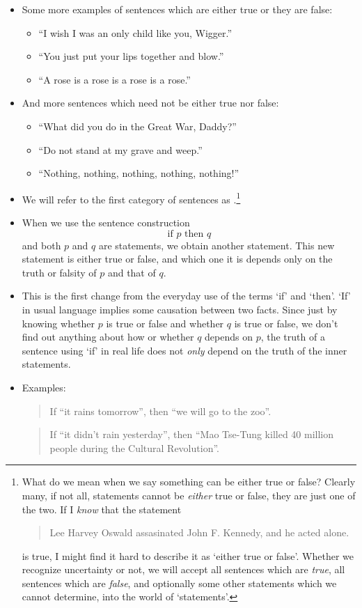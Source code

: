 \begin{itemize}
\item
Some more examples of sentences which are either true or they are false:
\begin{itemize}
 \item
``I wish I was an only child like you, Wigger.''
\item
``You just put your lips together and blow.''
\item
``A rose is a rose is a rose is a rose.''
\end{itemize}
\item
And more sentences which need not be either true nor false:
\begin{itemize}
\item
``What did you do in the Great War, Daddy?''
\item
 ``Do not stand at my grave and weep.''
\item
``Nothing, nothing, nothing, nothing, nothing!''
\end{itemize}
\item
We will refer to the first category of sentences as .\footnote{What do we mean when we say something can be either true or false? Clearly many, if not all, statements cannot be \emph{either} true or false, they are just one of the two. If I \emph{know} that the statement
\begin{quote}
Lee Harvey Oswald assasinated John F. Kennedy, and he acted alone.
\end{quote}
is true, I might find it hard to describe it as `either true or false'. Whether we recognize uncertainty or not, we will accept all sentences which are \emph{true}, all sentences which are \emph{false}, and optionally some other statements which we cannot determine, into the world of `statements'.}
\item
When we use the sentence construction 
\[ \text{if } p \text{ then } q \]
and both $p$ and $q$ are statements, we obtain another statement. This new statement is either true or false, and which one it is depends only on the truth or falsity of $p$ and that of $q$.
\item
This is the first change from the everyday use of the terms `if' and `then'. `If' in usual language implies some causation between two facts. Since just by knowing whether $p$ is true or false and whether $q$ is true or false, we don't find out anything about how or whether $q$ depends on $p$, the truth of a sentence using `if' in real life does not \emph{only} depend on the truth of the inner statements.
\item
Examples:
\begin{quote}
If ``it rains tomorrow'', then ``we will go to the zoo''.
\end{quote}
\begin{quote}
If ``it didn't rain yesterday'', then ``Mao Tse-Tung killed 40 million people during the Cultural Revolution''.
\end{quote}
\end{itemize}
 

